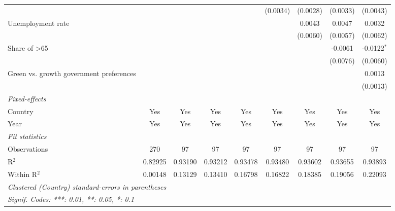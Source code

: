 \begin{table}[htbp]
\begin{tabular}{lcccccccc}
                                                            &          &                &                &                 & (0.0034)        & (0.0028)       & (0.0033)        & (0.0043)\\   
      Unemployment rate                                     &          &                &                &                 &                 & 0.0043         & 0.0047          & 0.0032\\   
                                                            &          &                &                &                 &                 & (0.0060)       & (0.0057)        & (0.0062)\\   
      Share of >65                                          &          &                &                &                 &                 &                & -0.0061         & -0.0122$^{*}$\\   
                                                            &          &                &                &                 &                 &                & (0.0076)        & (0.0060)\\   
      Green vs. growth government preferences               &          &                &                &                 &                 &                &                 & 0.0013\\   
                                                            &          &                &                &                 &                 &                &                 & (0.0013)\\   
      \midrule
      \emph{Fixed-effects}\\
      Country                                               & Yes      & Yes            & Yes            & Yes             & Yes             & Yes            & Yes             & Yes\\  
      Year                                                  & Yes      & Yes            & Yes            & Yes             & Yes             & Yes            & Yes             & Yes\\  
      \midrule
      \emph{Fit statistics}\\
      Observations                                          & 270      & 97             & 97             & 97              & 97              & 97             & 97              & 97\\  
      R$^2$                                                 & 0.82925  & 0.93190        & 0.93212        & 0.93478         & 0.93480         & 0.93602        & 0.93655         & 0.93893\\  
      Within R$^2$                                          & 0.00148  & 0.13129        & 0.13410        & 0.16798         & 0.16822         & 0.18385        & 0.19056         & 0.22093\\  
      \midrule \midrule
      \multicolumn{9}{l}{\emph{Clustered (Country) standard-errors in parentheses}}\\
      \multicolumn{9}{l}{\emph{Signif. Codes: ***: 0.01, **: 0.05, *: 0.1}}\\
   \end{tabular}
\end{table}


